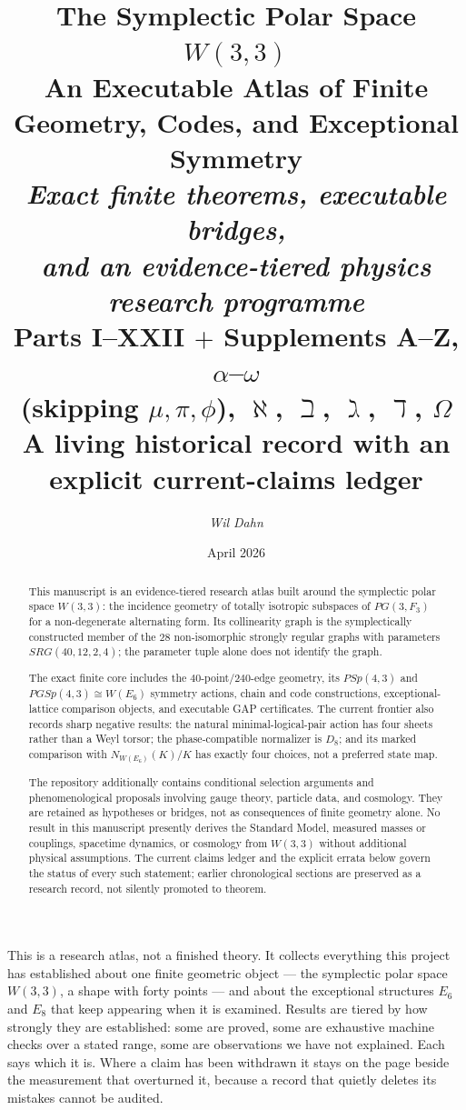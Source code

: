 \documentclass[12pt,a4paper]{article}
\title{%
  \vspace{-1.2cm}
  {\LARGE\bfseries The Symplectic Polar Space $W(3,3)$}\\[0.3cm]
  {\large\bfseries An Executable Atlas of Finite Geometry, Codes, and Exceptional Symmetry}\\[0.55cm]
  {\large\itshape Exact finite theorems, executable bridges,\\
  and an evidence-tiered physics research programme}\\[0.55cm]
  {\normalsize Parts I--XXII $+$ Supplements A--Z, $\alpha$--$\omega$\\
  (skipping $\mu, \pi, \phi$), $\aleph$, $\beth$, $\gimel$, $\daleth$, $\Omega$ \\
  \small A living historical record with an explicit current-claims ledger}
}
\author{\normalsize\itshape Wil Dahn}
\date{April 2026}
\def\mathbb#1{#1}%
\def\mathrm#1{#1}%
\theoremstyle{definition}
\newcommand{\SRG}{\mathrm{SRG}}
\newcommand{\PG}{\mathrm{PG}}
\newcommand{\PSp}{\mathrm{PSp}}
\newcommand{\PGSp}{\mathrm{PGSp}}
\newcommand{\FF}{\mathbb{F}}
\begin{document}
\maketitle

\begin{abstract}
This manuscript is an evidence-tiered research atlas built around the
symplectic polar space $W(3,3)$: the incidence geometry of totally isotropic
subspaces of $\PG(3,\FF_3)$ for a non-degenerate alternating form.  Its
collinearity graph is the symplectically constructed member of the $28$
non-isomorphic strongly regular graphs with parameters $\SRG(40,12,2,4)$;
the parameter tuple alone does not identify the graph.

The exact finite core includes the $40$-point/$240$-edge geometry, its
$\PSp(4,3)$ and $\PGSp(4,3)\cong W(E_6)$ symmetry actions, chain and code
constructions, exceptional-lattice comparison objects, and executable GAP
certificates.  The current frontier also records sharp negative results: the
natural minimal-logical-pair action has four sheets rather than a Weyl torsor;
the phase-compatible normalizer is $D_8$; and its marked comparison with
$N_{W(E_6)}(K)/K$ has exactly four choices, not a preferred state map.

The repository additionally contains conditional selection arguments and
phenomenological proposals involving gauge theory, particle data, and
cosmology.  They are retained as hypotheses or bridges, not as consequences
of finite geometry alone.  No result in this manuscript presently derives the
Standard Model, measured masses or couplings, spacetime dynamics, or
cosmology from $W(3,3)$ without additional physical assumptions.  The current
claims ledger and the explicit errata below govern the status of every such
statement; earlier chronological sections are preserved as a research record,
not silently promoted to theorem.
\end{abstract}


\begin{plainbox}
This is a research atlas, not a finished theory. It collects everything this project has
established about one finite geometric object --- the symplectic polar space $W(3,3)$, a
shape with forty points --- and about the exceptional structures $E_6$ and $E_8$ that keep
appearing when it is examined. Results are tiered by how strongly they are established:
some are proved, some are exhaustive machine checks over a stated range, some are
observations we have not explained. Each says which it is. Where a claim has been withdrawn
it stays on the page beside the measurement that overturned it, because a record that
quietly deletes its mistakes cannot be audited.
\end{plainbox}
\end{document}
